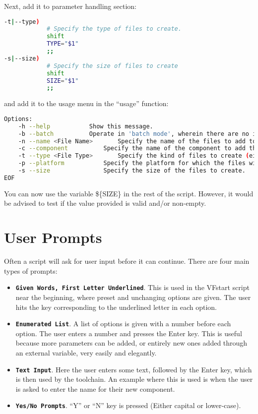 \documentclass[a4paper, oneside, 11pt, titlepage, onecolumn, openright]{report}
\begin{document}
Next, add it to parameter handling section:
\begin{lstlisting}[frame=trBL, breaklines=true, language=bash]
-t|--type)
			# Specify the type of files to create.
			shift
			TYPE="$1"
			;;
-s|--size)
			# Specify the size of files to create
			shift
			SIZE="$1"
			;;
\end{lstlisting}

and add it to the usage menu in the ``usage'' function:

\begin{lstlisting}[frame=trBL, breaklines=true, language = bash]
Options:
	-h --help			Show this message.
	-b --batch			Operate in 'batch mode', wherein there are no interactive prompts.
	-n --name <File Name>		Specify the name of the files to add to the current project.
	-c --component			Specify the name of the component to add the files to.  Defaults to the 'active component'.
	-t --type <File Type>		Specify the kind of files to create (either 'C' or 'CPP').
	-p --platform			Specify the platform for which the files will be created (BareMetal/freertos)
	-s --size				Specify the size of the files to create.
EOF
\end{lstlisting}

You can now use the variable \$\{SIZE\} in the rest of the script. However, it would be advised to test if the value provided is valid and/or non-empty.

\section{User Prompts}
			\label{s:UserPrompts}
			Often a script will ask for user input before it can continue. There are four main types of prompts:
			
\begin{itemize}

\item \textbf{\texttt{Given Words, First Letter Underlined}}. This is used in the VFstart script near the beginning, where preset and unchanging options are given. The user hits the key corresponding to the underlined letter in each option. 

\item \textbf{\texttt{Enumerated List}}. A list of options is given with a number before each option. The user enters a number and presses the Enter key. This is useful because more parameters can be added, or entirely new ones added through an external variable, very easily and elegantly.

\item \textbf{\texttt{Text Input}}. Here the user enters some text, followed by the Enter key, which is then used by the toolchain. An example where this is used is when the user is asked to enter the name for their new component.

\item \textbf{\texttt{Yes/No Prompts}}. ``Y'' or ``N'' key is pressed (Either capital or lower-case).
\end{itemize}			
			
\end{document}
